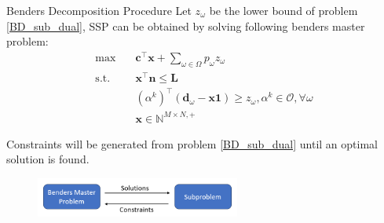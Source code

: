 \begin{frame}{Benders Decomposition Procedure}
  \small
  Let $z_{\omega}$ be the lower bound of problem \eqref{BD_sub_dual}, SSP can be obtained by solving following benders master problem:
  \begin{equation}\label{BD_master2}
    \begin{aligned}
      \max \quad & \mathbf{c}^{\intercal} \mathbf{x} + \sum_{\omega \in \Omega} p_{\omega} z_{\omega} \\
      \text {s.t.} \quad & \mathbf{x}^{\intercal} \mathbf{n} \leq \mathbf{L} \\
      & (\alpha^{k})^{\intercal}(\mathbf{d}_{\omega}- \mathbf{x} \mathbf{1}) \geq z_{\omega}, \alpha^k \in \mathcal{O}, \forall \omega \\
       & \mathbf{x} \in \mathbb{N}^{M \times N, +}
    \end{aligned}
\end{equation} 

  Constraints will be generated from problem \eqref{BD_sub_dual} until an optimal solution is found.

  \begin{figure}[ht]
    \centering
    \includegraphics[width = 0.6\textwidth]{./images/BD.png}
  \end{figure}
\end{frame}




